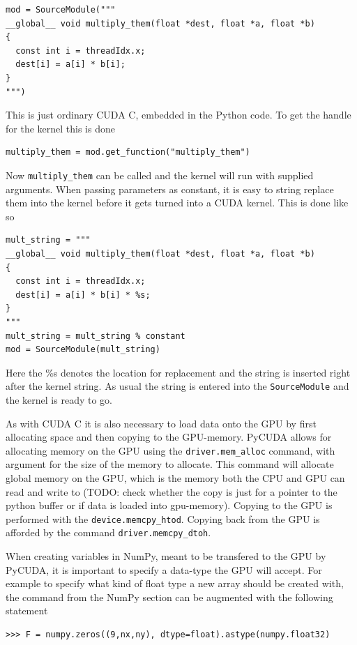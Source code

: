 \begin{verbatim}
mod = SourceModule("""
__global__ void multiply_them(float *dest, float *a, float *b)
{
  const int i = threadIdx.x;
  dest[i] = a[i] * b[i];
}
""")
\end{verbatim}

This is just ordinary CUDA C, embedded in the Python code. To get the handle for the kernel this is done

\begin{verbatim}
multiply_them = mod.get_function("multiply_them")
\end{verbatim}

Now \texttt{multiply\_them} can be called and the kernel will run with supplied arguments. When passing parameters as constant, it is easy to string replace them into the kernel before it gets turned into a CUDA kernel. This is done like so

\begin{verbatim}
mult_string = """
__global__ void multiply_them(float *dest, float *a, float *b)
{
  const int i = threadIdx.x;
  dest[i] = a[i] * b[i] * %s;
}
"""
mult_string = mult_string % constant
mod = SourceModule(mult_string)
\end{verbatim}

Here the \%s denotes the location for replacement and the string is inserted right after the kernel string. As usual the string is entered into the \texttt{SourceModule} and the kernel is ready to go.

As with CUDA C it is also necessary to load data onto the GPU by first allocating space and then copying to the GPU-memory. PyCUDA allows for allocating memory on the GPU using the \texttt{driver.mem\_alloc} command, with argument for the size of the memory to allocate. This command will allocate global memory on the GPU, which is the memory both the CPU and GPU can read and write to (TODO: check whether the copy is just for a pointer to the python buffer or if data is loaded into gpu-memory). Copying to the GPU is performed with the \texttt{device.memcpy\_htod}. Copying back from the GPU is afforded by the command \texttt{driver.memcpy\_dtoh}.

When creating variables in NumPy, meant to be transfered to the GPU by PyCUDA, it is important to specify a data-type the GPU will accept. For example to specify what kind of float type a new array should be created with, the command from the NumPy section can be augmented with the following statement

\begin{verbatim}
>>> F = numpy.zeros((9,nx,ny), dtype=float).astype(numpy.float32)
\end{verbatim}

